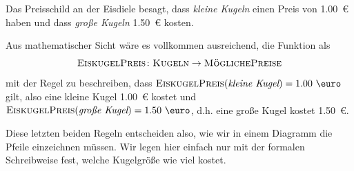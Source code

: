 \documentclass[../../main.tex]{subfiles}
\begin{document}
\begin{example}{}
    Das Preisschild an der Eisdiele besagt, dass \emph{kleine Kugeln} einen Preis von 1.00~\euro{} haben und dass \emph{große Kugeln} 1.50~\euro{} kosten. 
    
    Aus mathematischer Sicht wäre es vollkommen ausreichend, die Funktion als \[\textsc{EiskugelPreis}\colon\textsc{Kugeln}\rightarrow\textsc{MöglichePreise}\] 
    mit der Regel zu beschreiben, dass $\textsc{EiskugelPreis}(\textit{kleine Kugel})=\text{1.00 \euro}$ gilt, also eine kleine Kugel 1.00~\euro{} kostet und $\textsc{EiskugelPreis}(\textit{große Kugel})=\text{1.50 \euro}$, d.h. eine große Kugel kostet 1.50~\euro. 
    
    Diese letzten beiden Regeln entscheiden also, wie wir in einem Diagramm die Pfeile einzeichnen müssen. Wir legen hier einfach nur mit der formalen Schreibweise fest, welche Kugelgröße wie viel kostet.
\end{example}
\end{document}
